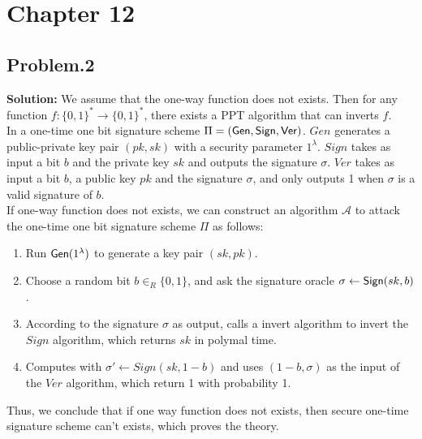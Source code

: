 \documentclass[11pt,twoside,a4paper]{article}
\begin{document}
	\section{Chapter 12}
	\subsection{Problem.2}
	{\bf Solution: }We assume that the one-way function does not exists. Then for any function $f:{\{0,1\}}^{*}\rightarrow{\{0,1\}}^{*}$, there exists a PPT algorithm that can inverts $f$.\\
	In a one-time one bit signature scheme ${\Pi}=({\sf Gen,Sign,Ver})$. ${Gen}$ generates a public-private key pair $(pk,sk)$ with a security parameter $1^{\lambda}$. ${Sign}$ takes as input a bit $b$ and the private key $sk$ and outputs the signature $\sigma$. ${Ver}$ takes as input a bit $b$, a public key $pk$ and the signature $\sigma$, and only outputs 1 when $\sigma$ is a valid signature of $b$.\\
	If one-way function does not exists, we can construct an algorithm $\mathcal{A}$ to attack the one-time one bit signature scheme ${\Pi}$ as follows:\\
	\begin{enumerate}
		\item Run ${\sf Gen}(1^{\lambda})$ to generate a key pair $(sk,pk)$.
		\item Choose a random bit $b{\in}_{R}\{0,1\}$, and ask the signature oracle $\sigma \leftarrow {\sf Sign}(sk,b)$.
		\item According to the signature $\sigma$ as output, calls a invert algorithm to invert the $Sign$ algorithm, which returns $sk$ in polymal time.
		\item Computes with ${\sigma}'\leftarrow Sign(sk,1-b)$ and uses $(1-b,{\sigma})$ as the input of the $Ver$ algorithm, which return 1 with probability 1. 
	\end{enumerate}
	Thus, we conclude that if one way function does not exists, then secure one-time signature scheme can't exists, which proves the theory.
\end{document}

